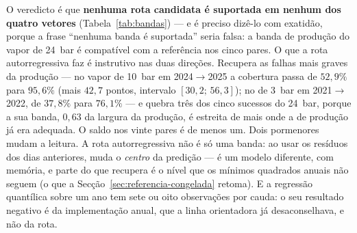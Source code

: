 O veredicto é que \textbf{nenhuma rota candidata é suportada em nenhum dos
quatro vetores} (Tabela~\ref{tab:bandas}) --- e é preciso dizê-lo com
exatidão, porque a frase ``nenhuma banda é suportada'' seria falsa: a banda
de produção do vapor de 24~bar é compatível com a referência nos cinco pares.
O que a rota autorregressiva faz é instrutivo nas duas direções. Recupera
as falhas mais graves da produção --- no vapor de 10~bar em 2024${\to}$2025
a cobertura passa de $52{,}9\%$ para $95{,}6\%$ (mais $42{,}7$ pontos,
intervalo $[30{,}2;\,56{,}3]$); no de 3~bar em 2021${\to}$2022, de $37{,}8\%$
para $76{,}1\%$ --- e quebra três dos cinco sucessos do 24~bar, porque a sua
banda, $0{,}63$ da largura da produção, é estreita de mais onde a de
produção já era adequada. O saldo nos vinte pares é de menos um. Dois
pormenores mudam a leitura. A rota autorregressiva não é só uma banda: ao
usar os resíduos dos dias anteriores, muda o \emph{centro} da predição ---
é um modelo diferente, com memória, e parte do que recupera é o nível que os
mínimos quadrados anuais não seguem (o que a Secção~\ref{sec:referencia-congelada}
retoma). E a regressão quantílica sobre um ano tem sete ou oito observações
por cauda: o seu resultado negativo é da implementação anual, que a linha
orientadora já desaconselhava, e não da rota.

